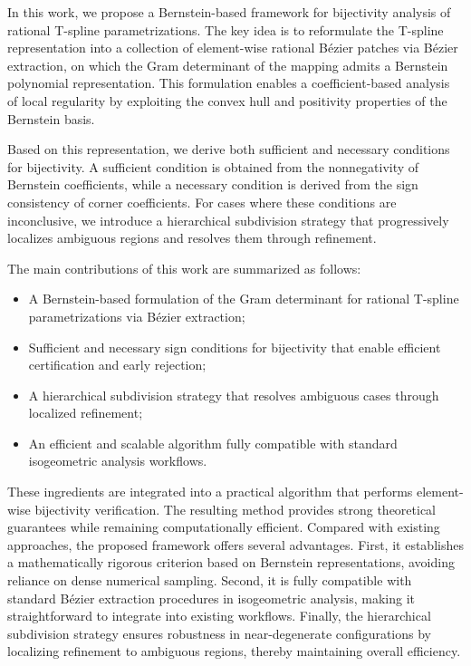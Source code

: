 \documentclass{jssc}
\begin{document}
In this work, we propose a Bernstein-based framework for bijectivity analysis of rational T-spline parametrizations. The key idea is to reformulate the T-spline representation into a collection of element-wise rational B\'ezier patches via B\'ezier extraction, on which the Gram determinant of the mapping admits a Bernstein polynomial representation. This formulation enables a coefficient-based analysis of local regularity by exploiting the convex hull and positivity properties of the Bernstein basis.

Based on this representation, we derive both sufficient and necessary conditions for bijectivity. A sufficient condition is obtained from the nonnegativity of Bernstein coefficients, while a necessary condition is derived from the sign consistency of corner coefficients. For cases where these conditions are inconclusive, we introduce a hierarchical subdivision strategy that progressively localizes ambiguous regions and resolves them through refinement.

The main contributions of this work are summarized as follows:
\begin{itemize}
    \item A Bernstein-based formulation of the Gram determinant for rational T-spline parametrizations via B\'ezier extraction;
    \item Sufficient and necessary sign conditions for bijectivity that enable efficient certification and early rejection;
    \item A hierarchical subdivision strategy that resolves ambiguous cases through localized refinement;
    \item An efficient and scalable algorithm fully compatible with standard isogeometric analysis workflows.
\end{itemize}

These ingredients are integrated into a practical algorithm that performs element-wise bijectivity verification. The resulting method provides strong theoretical guarantees while remaining computationally efficient. Compared with existing approaches, the proposed framework offers several advantages. First, it establishes a mathematically rigorous criterion based on Bernstein representations, avoiding reliance on dense numerical sampling. Second, it is fully compatible with standard B\'ezier extraction procedures in isogeometric analysis, making it straightforward to integrate into existing workflows. Finally, the hierarchical subdivision strategy ensures robustness in near-degenerate configurations by localizing refinement to ambiguous regions, thereby maintaining overall efficiency.
\end{document}
